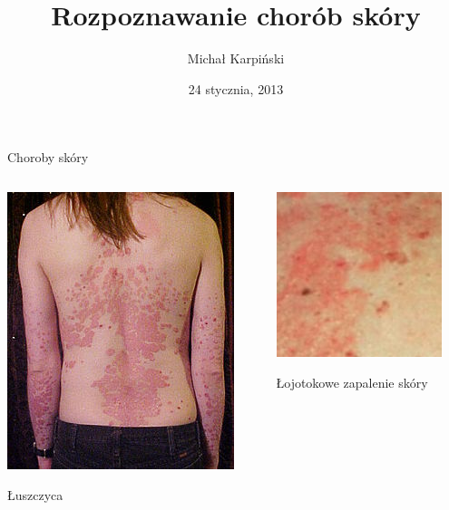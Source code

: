 \documentclass{beamer}
\title{Rozpoznawanie chorób skóry}
\author{Michał Karpiński}
\date{24 stycznia, 2013}
\begin{document}
\begin{frame}[plain]
  \titlepage
\end{frame}

\begin{frame}{Choroby skóry}

\begin{columns}
\begin{column}{0.5\textwidth}
\begin{center}
  \includegraphics[scale=0.5]{img/psoriasis.jpg}

  Łuszczyca
\end{center}
\end{column}
\begin{column}{0.5\textwidth}
\begin{center}
  \includegraphics[scale=0.5]{img/seboreic_dermatitis.jpeg}  

  Łojotokowe zapalenie skóry
\end{center}
\end{column}
\end{columns}
\end{frame}
\end{document}

